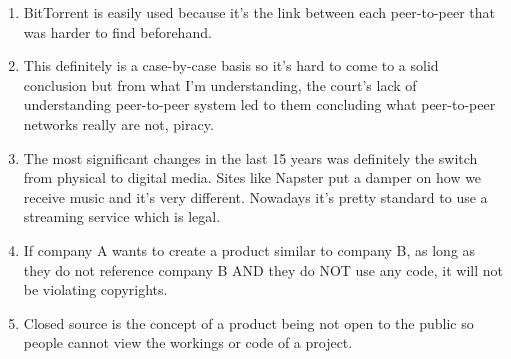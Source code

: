 \documentclass[12pt]{article}
\begin{document}
\begin{enumerate}
        \item BitTorrent is easily used because it's the link between each peer-to-peer that was harder to find beforehand.
        \item This definitely is a case-by-case basis so it's hard to come to a solid conclusion but from what I'm understanding, the court's lack of understanding peer-to-peer system led to them concluding what peer-to-peer networks really are not, piracy.
        \item The most significant changes in the last 15 years was definitely the switch from physical to digital media. Sites like Napster put a damper on how we receive music and it's very different. Nowadays it's pretty standard to use a streaming service which is legal.
        \item If company A wants to create a product similar to company B, as long as they do not reference company B AND they do NOT use any code, it will not be violating copyrights.
        \item Closed source is the concept of a product being not open to the public so people cannot view the workings or code of a project. 
    \end{enumerate}
\end{document}
